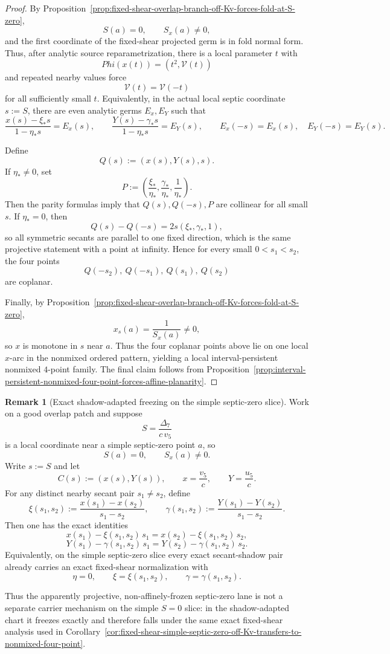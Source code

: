 \documentclass[11pt,a4paper]{amsart}
\def\Phi{Phi}%
\theoremstyle{plain}
\theoremstyle{definition}
\newtheorem{remark}[theorem]{Remark}
\begin{document}
\begin{proof}
By Proposition~\ref{prop:fixed-shear-overlap-branch-off-Kv-forces-fold-at-S-zero},
\[
S(a)=0,
\qquad
S_x(a)\neq 0,
\]
and the first coordinate of the fixed-shear projected germ is in fold normal
form. Thus, after analytic source reparametrization, there is a local parameter
$t$ with
\[
\Phi(x(t))=(t^2,\mathcal V(t))
\]
and repeated nearby values force
\[
\mathcal V(t)=\mathcal V(-t)
\]
for all sufficiently small $t$. Equivalently, in the actual local septic
coordinate $s:=S$, there are even analytic germs $E_x,E_Y$ such that
\[
\frac{x(s)-\xi_*s}{1-\eta_*s}=E_x(s),
\qquad
\frac{Y(s)-\gamma_*s}{1-\eta_*s}=E_Y(s),
\qquad
E_x(-s)=E_x(s),\quad E_Y(-s)=E_Y(s).
\]

Define
\[
Q(s):=(x(s),Y(s),s).
\]
If $\eta_*\neq 0$, set
\[
P:=\left(\frac{\xi_*}{\eta_*},\frac{\gamma_*}{\eta_*},\frac1{\eta_*}\right).
\]
Then the parity formulas imply that $Q(s),Q(-s),P$ are collinear for all
small $s$. If $\eta_*=0$, then
\[
Q(s)-Q(-s)=2s(\xi_*,\gamma_*,1),
\]
so all symmetric secants are parallel to one fixed direction, which is the same
projective statement with a point at infinity. Hence for every small
$0<s_1<s_2$, the four points
\[
Q(-s_2),\ Q(-s_1),\ Q(s_1),\ Q(s_2)
\]
are coplanar.

Finally, by Proposition~\ref{prop:fixed-shear-overlap-branch-off-Kv-forces-fold-at-S-zero},
\[
x_s(a)=\frac{1}{S_x(a)}\neq 0,
\]
so $x$ is monotone in $s$ near $a$. Thus the four coplanar points above
lie on one local $x$-arc in the nonmixed ordered pattern, yielding a local
interval-persistent nonmixed $4$-point family. The final claim follows from
Proposition~\ref{prop:interval-persistent-nonmixed-four-point-forces-affine-planarity}.
\end{proof}

\begin{remark}[Exact shadow-adapted freezing on the simple septic-zero slice]
\label{rem:exact-shadow-adapted-freezing-simple-septic-zero}
Work on a good overlap patch and suppose
\[
S=\frac{\Delta_7}{c\,v_5}
\]
is a local coordinate near a simple septic-zero point $a$, so
\[
S(a)=0,
\qquad
S_x(a)\neq 0.
\]
Write $s:=S$ and let
\[
C(s):=(x(s),Y(s)),
\qquad
x=\frac{v_5}{c},
\qquad
Y=\frac{u_5}{c}.
\]
For any distinct nearby secant pair $s_1\neq s_2$, define
\[
\xi(s_1,s_2):=\frac{x(s_1)-x(s_2)}{s_1-s_2},
\qquad
\gamma(s_1,s_2):=\frac{Y(s_1)-Y(s_2)}{s_1-s_2}.
\]
Then one has the exact identities
\[
x(s_1)-\xi(s_1,s_2)\,s_1
=
x(s_2)-\xi(s_1,s_2)\,s_2,
\]
\[
Y(s_1)-\gamma(s_1,s_2)\,s_1
=
Y(s_2)-\gamma(s_1,s_2)\,s_2.
\]
Equivalently, on the simple septic-zero slice every exact secant-shadow pair
already carries an exact fixed-shear normalization with
\[
\eta=0,
\qquad
\xi=\xi(s_1,s_2),
\qquad
\gamma=\gamma(s_1,s_2).
\]

Thus the apparently projective, non-affinely-frozen septic-zero lane is not a
separate carrier mechanism on the simple $S=0$ slice: in the shadow-adapted
chart it freezes exactly and therefore falls under the same exact fixed-shear
analysis used in
Corollary~\ref{cor:fixed-shear-simple-septic-zero-off-Kv-transfers-to-nonmixed-four-point}.
\end{remark}
\end{document}
